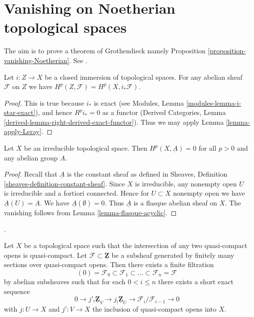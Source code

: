 \section{Vanishing on Noetherian topological spaces}
\label{section-vanishing-Noetherian}

\noindent
The aim is to prove a theorem of Grothendieck namely
Proposition \ref{proposition-vanishing-Noetherian}. See \cite{Tohoku}.

\begin{lemma}
\label{lemma-cohomology-and-closed-immersions}
Let $i : Z \to X$ be a closed immersion of topological spaces.
For any abelian sheaf $\mathcal{F}$ on $Z$ we have
$H^p(Z, \mathcal{F}) = H^p(X, i_*\mathcal{F})$.
\end{lemma}

\begin{proof}
This is true because $i_*$ is exact (see
Modules, Lemma \ref{modules-lemma-i-star-exact}),
and hence $R^pi_* = 0$ as a functor
(Derived Categories, Lemma \ref{derived-lemma-right-derived-exact-functor}).
Thus we may apply Lemma \ref{lemma-apply-Leray}.
\end{proof}

\begin{lemma}
\label{lemma-irreducible-constant-cohomology-zero}
Let $X$ be an irreducible topological space.
Then $H^p(X, \underline{A}) = 0$ for all $p > 0$
and any abelian group $A$.
\end{lemma}

\begin{proof}
Recall that $\underline{A}$ is the constant sheaf as defined
in Sheaves, Definition \ref{sheaves-definition-constant-sheaf}.
Since $X$ is irreducible, any nonempty open $U$ is
irreducible and a fortiori connected. Hence for $U \subset X$
nonempty open we have $\underline{A}(U) = A$.
We have $\underline{A}(\emptyset) = 0$. Thus $\underline{A}$
is a flasque abelian sheaf on $X$. The vanishing follows
from Lemma \ref{lemma-flasque-acyclic}.
\end{proof}

\begin{lemma}
\label{lemma-subsheaf-of-constant-sheaf}
\begin{reference}
\cite[Page 168]{Tohoku}.
\end{reference}
Let $X$ be a topological space such that the intersection of any
two quasi-compact opens is quasi-compact. Let
$\mathcal{F} \subset \underline{\mathbf{Z}}$
be a subsheaf generated by finitely many sections over quasi-compact opens.
Then there exists a finite filtration
$$
(0) = \mathcal{F}_0 \subset \mathcal{F}_1 \subset \ldots \subset
\mathcal{F}_n = \mathcal{F}
$$
by abelian subsheaves such that for each $0 < i \leq n$
there exists a short exact sequence
$$
0 \to j'_!\underline{\mathbf{Z}}_V \to j_!\underline{\mathbf{Z}}_U \to
\mathcal{F}_i/\mathcal{F}_{i - 1} \to 0
$$
with $j : U \to X$ and $j' : V \to X$ the inclusion of quasi-compact opens
into $X$.
\end{lemma}

